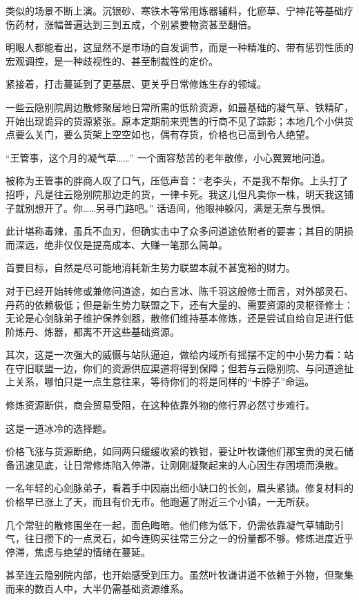 类似的场景不断上演。沉银砂、寒铁木等常用炼器辅料，化瘀草、宁神花等基础疗伤药材，涨幅普遍达到三到五成，个别紧要物资甚至翻倍。

明眼人都能看出，这显然不是市场的自发调节，而是一种精准的、带有惩罚性质的宏观调控，是一种歧视性的、甚至制裁性的定价。

紧接着，打击蔓延到了更基层、更关乎日常修炼生存的领域。

一些云隐别院周边散修聚居地日常所需的低阶资源，如最基础的凝气草、铁精矿，开始出现诡异的货源紧张。原本定期前来兜售的行商不见了踪影；本地几个小供货点要么关门，要么货架上空空如也，偶有存货，价格也已高到令人绝望。

“王管事，这个月的凝气草……” 一个面容愁苦的老年散修，小心翼翼地问道。

被称为王管事的胖商人叹了口气，压低声音：“老李头，不是我不帮你。上头打了招呼，凡是往云隐别院那边走的货，一律卡死。我这儿但凡卖你一株，明天我这铺子就别想开了。你……另寻门路吧。” 话语间，他眼神躲闪，满是无奈与畏惧。

此计堪称毒辣，虽兵不血刃，但确实击中了众多问道途依附者的要害；其目的阴损而深远，绝非仅仅是提高成本、大赚一笔那么简单。

首要目标，自然是尽可能地消耗新生势力联盟本就不甚宽裕的财力。

对于已经开始转修或兼修问道途，如白言冰、陈千羽这般修士而言，对外部灵石、丹药的依赖极低；但是新生势力联盟之下，还有大量的、需要资源的灵枢径修士：无论是心剑脉弟子维护保养剑器，散修们维持基本修炼，还是尝试自给自足进行低阶炼丹、炼器，都离不开这些基础资源。

其次，这是一次强大的威慑与站队逼迫，做给内域所有摇摆不定的中小势力看：站在守旧联盟一边，你们的资源供应渠道将得到保障；但若与云隐别院、与问道途扯上关系，哪怕只是一点生意往来，等待你们的将是同样的“卡脖子”命运。

修炼资源断供，商会贸易受阻，在这种依靠外物的修行界必然寸步难行。

这是一道冰冷的选择题。

价格飞涨与货源断绝，如同两只缓缓收紧的铁钳，要让叶牧谦他们那宝贵的灵石储备迅速见底，让日常修炼陷入停滞，让刚刚凝聚起来的人心因生存困境而涣散。

一名年轻的心剑脉弟子，看着手中因崩出细小缺口的长剑，眉头紧锁。修复材料的价格早已涨上了天，而且有价无市。他跑遍了附近三个小镇，一无所获。

几个常驻的散修围坐在一起，面色晦暗。他们修为低下，仍需依靠凝气草辅助引气，往日攒下的一点灵石，如今连购买往常三分之一的份量都不够。修炼进度近乎停滞，焦虑与绝望的情绪在蔓延。

甚至连云隐别院内部，也开始感受到压力。虽然叶牧谦讲道不依赖于外物，但聚集而来的数百人中，大半仍需基础资源维系。

